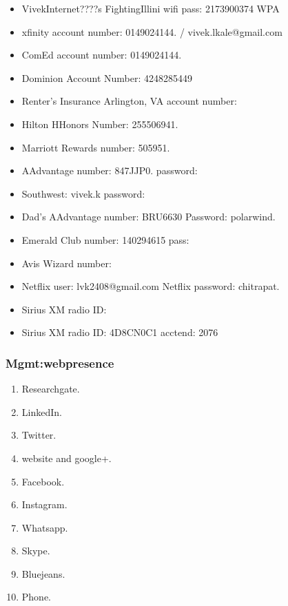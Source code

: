 \begin{frame}[label=myInformation]
\begin{itemize}
\begin{itemize}
        \item \tiny VivekInternet????s FightingIllini  wifi pass:
          2173900374 WPA
        \item \tiny xfinity account number: 0149024144. /  vivek.lkale@gmail.com 
        \item \tiny ComEd account number: 0149024144. 
        \item \tiny Dominion Account Number: 4248285449
        \item \tiny Renter's Insurance Arlington, VA account number: 
        \item \tiny Hilton HHonors Number: 255506941. 
        \item \tiny Marriott Rewards number: 505951. 
        \item \tiny AAdvantage number: 847JJP0. password: 
        \item \tiny Southwest: vivek.k password: 
        \item \tiny Dad's AAdvantage number: BRU6630 Password:
          polarwind.
        \item \tiny Emerald Club number:  140294615   pass:
        \item \tiny Avis Wizard number: 
        \item \tiny Netflix user:  lvk2408@gmail.com  Netflix
          password: chitrapat.
        \item \tiny Sirius XM radio ID: 
          \item \tiny Sirius XM radio ID: 4D8CN0C1 acctend: 2076
        \end{itemize} 
\end{itemize}
\end{frame} 

\begin{frame}
\frametitle{Mgmt:webpresence}

\begin{enumerate} 
\small \item \small Researchgate.
\item \small LinkedIn.
\item \small Twitter.
\item \small website and google+.
\item \small Facebook.
\item \small Instagram. 
\item \small Whatsapp.
\item \small Skype.
\item \small Bluejeans.
\item \small Phone.
\end{enumerate}

\end{frame} 


